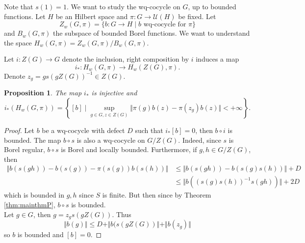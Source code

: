 \documentclass{article}
\newtheorem{prop}[theorem]{Proposition}
\theoremstyle{definition}
\theoremstyle{remark}
\numberwithin{equation}{section}
\begin{document}
Note that $s(1)=1$. We want to study the wq-cocycle on $G$, up to bounded functions. Let $H$ be an Hilbert space and $\pi:G\to \mathcal{U}(H)$ be fixed. Let $$Z_w(G,\pi)=\{b:G\to H \mid b\textrm{ wq-cocycle for }\pi\}$$ and $B_w(G,\pi)$ the subspace of bounded Borel functions. We want to understand the space $H_w(G,\pi)=Z_w(G,\pi)/B_w(G,\pi)$.\medskip

Let $i:Z(G)\to G$ denote the inclusion, right composition by $i$ induces a map $$i_*:H_w(G,\pi)\to H_w(Z(G),\pi).$$ Denote $z_g=gs(gZ(G))^{-1}\in Z(G)$.
\begin{prop}\label{prop:infinitecenter}
    The map $i_*$ is injective and $$i_*\left(H_w(G,\pi)\right)=\left\lbrace [b] \mid \underset{g\in G,z\in Z(G)}{\sup}\Vert \pi(g)b(z)-\pi(z_g)b(z) \Vert<+\infty\right\rbrace.$$
\end{prop}
\begin{proof}
    Let $b$ be a wq-cocycle with defect $D$ such that $i_*[b]=0$, then $b\circ i$ is bounded. The map $b\circ s$ is also a wq-cocycle on $G/Z(G)$. Indeed, since $s$ is Borel regular, $b\circ s$ is Borel and locally bounded. Furthermore, if $g,h\in G/Z(G)$, then \begin{align*}
        \Vert b(s(gh))-b(s(g))-\pi(s(g))b(s(h))\Vert & \leq \Vert b(s(gh))-b(s(g)s(h))\Vert+D\\
        & \leq \Vert b((s(g)s(h))^{-1}s(gh))\Vert+2D
    \end{align*}which is bounded in $g,h$ since $S$ is finite. But then since by Theorem \ref{thm:mainthmP}, $b\circ s$ is bounded.\\
    Let $g\in G$, then $g=z_gs(gZ(G))$. Thus $$\Vert b(g)\Vert \leq D+\Vert b(s(gZ(G))\Vert+\Vert b(z_g)\Vert$$so $b$ is bounded and $[b]=0$.\medskip


\end{proof}
\end{document}
